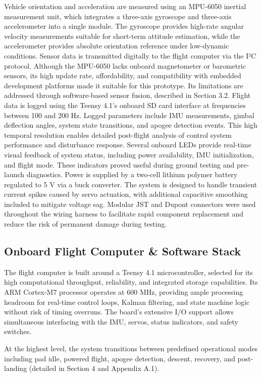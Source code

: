 Vehicle orientation and acceleration are measured using an MPU-6050 inertial measurement unit, which integrates a three-axis gyroscope and three-axis accelerometer into a single module. The gyroscope provides high-rate angular velocity measurements suitable for short-term attitude estimation, while the accelerometer provides absolute orientation reference under low-dynamic conditions. Sensor data is transmitted digitally to the flight computer via the I²C protocol.
Although the MPU-6050 lacks onboard magnetometer or barometric sensors, its high update rate, affordability, and compatibility with embedded development platforms made it suitable for this prototype. Its limitations are addressed through software-based sensor fusion, described in Section 3.2.
Flight data is logged using the Teensy 4.1’s onboard SD card interface at frequencies between 100 and 200 Hz. Logged parameters include IMU measurements, gimbal deflection angles, system state transitions, and apogee detection events. This high temporal resolution enables detailed post-flight analysis of control system performance and disturbance response.
Several onboard LEDs provide real-time visual feedback of system status, including power availability, IMU initialization, and flight mode. These indicators proved useful during ground testing and pre-launch diagnostics.
Power is supplied by a two-cell lithium polymer battery regulated to 5 V via a buck converter. The system is designed to handle transient current spikes caused by servo actuation, with additional capacitive smoothing included to mitigate voltage sag. Modular JST and Dupont connectors were used throughout the wiring harness to facilitate rapid component replacement and reduce the risk of permanent damage during testing.


\subsection{Onboard Flight Computer \& Software Stack}

The flight computer is built around a Teensy 4.1 microcontroller, selected for its high computational throughput, reliability, and integrated storage capabilities. Its ARM Cortex-M7 processor operates at 600 MHz, providing ample processing headroom for real-time control loops, Kalman filtering, and state machine logic without risk of timing overruns. The board’s extensive I/O support allows simultaneous interfacing with the IMU, servos, status indicators, and safety switches.

At the highest level, the system transitions between predefined operational modes including pad idle, powered flight, apogee detection, descent, recovery, and post-landing (detailed in Section 4 and Appendix A.1).

